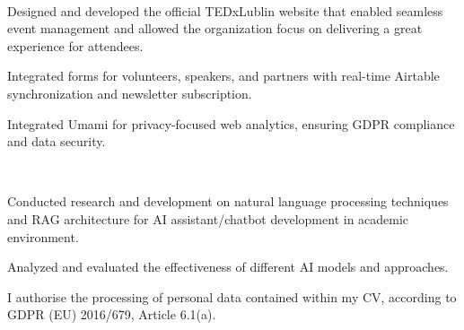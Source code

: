 \documentclass[]{deedy-resume-openfont}
\begin{document}
\begin{minipage}[t]{0.55\textwidth}
 \\

\begin{tightemize}
\item Designed and developed the official TEDxLublin website that enabled seamless event management and allowed the organization focus on delivering a great experience for attendees.
\item Integrated forms for volunteers, speakers, and partners with real-time Airtable synchronization and newsletter subscription.
\item Integrated Umami for privacy-focused web analytics, ensuring GDPR compliance and data security.
\end{tightemize}
\sectionsep

 \\
\begin{tightemize}
\item Conducted research and development on natural language processing techniques and RAG architecture for AI assistant/chatbot development in academic environment.
\item Analyzed and evaluated the effectiveness of different AI models and approaches.
\end{tightemize}
\sectionsep

\end{minipage} 

\vfill %
\begin{center}
    \scriptsize %
    I authorise the processing of personal data contained within my CV, according to GDPR (EU) 2016/679, Article 6.1(a).
\end{center}
\end{document}
